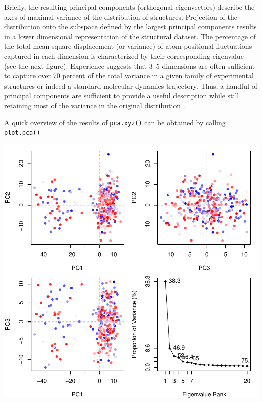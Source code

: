 \documentclass[letter]{article}
\begin{document}
Briefly, the resulting principal components (orthogonal eigenvectors) describe the axes of maximal variance of the distribution of structures. Projection of the distribution onto the subspace defined by the largest principal components results in a lower dimensional representation of the structural dataset. The percentage of the total mean square displacement (or variance) of atom positional fluctuations captured in each dimension is characterized by their corresponding eigenvalue (see the next figure). Experience suggests that 3--5 dimensions are often sufficient to capture over 70 percent of the total variance in a given family of experimental structures or indeed a standard molecular dynamics trajectory. Thus, a handful of principal components are sufficient to provide a useful description while still retaining most of the variance in the original distribution \citet{grant06}.

A quick overview of the results of \texttt{pca.xyz()} can be obtained by calling \texttt{plot.pca()}
\begin{Schunk}
\end{Schunk}
\includegraphics{Bio3D_trajectory-012}
\end{document}
